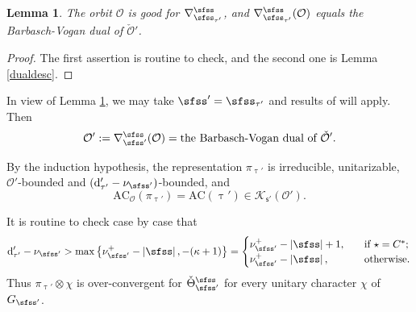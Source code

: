 \documentclass[11pt,a4paper]{amsart}
\def\abs#1{\left|{#1}\right|}
\newcommand{\CK}{{\mathcal {K}}}
\newcommand{\CO}{{\mathcal {O}}}
\numberwithin{equation}{section}
\newtheorem{lem}[thm]{Lemma}
\theoremstyle{remark}
\begin{document}
 \begin{lem}\label{lem78}
 The orbit $\CO$ is good for $\nabla^\sfss_{\sfss_{\tau'}}$, and $\nabla^\sfss_{\sfss_{\tau'}}(\CO)$ equals the Barbasch-Vogan dual  of $\check \CO'$.
 \end{lem}
\begin{proof}
The first assertion is routine to check, and the second one is Lemma \ref{dualdesc}.
\end{proof}

In view of Lemma \ref{lem78}, we may take $\sfss'=\sfss_{\tau'}$ and results of  will apply. Then
\[
\CO':= \nabla^\sfss_{\sfss'}(\CO)=\textrm{the Barbasch-Vogan dual  of $\check \CO'$}.
\]



By the induction hypothesis, the representation $\pi_{\uptau'}$ is irreducible, unitarizable, $\CO'$-bounded and $( \mathrm d'_{\tau'}-\nu_{\sfss'})$-bounded,     and
\[
\mathrm{AC}_\CO(\pi_{\uptau'})=\mathrm{AC}(\uptau')\in \CK_{\mathsf s'}(\CO').
\]

It is routine to check case by case  that
\[
\mathrm d'_{\tau'}-\nu_{\sfss'}>\max \left \{\nu^+_{\sfss'}-\abs{\sfss}, -(\kappa +1)\right \}=
  \begin{cases}
\nu^+_{\sfss'}-\abs{\sfss} +1,\quad& \textrm{if $\star =C^*$};\\
 \nu^+_{\sfss'}-\abs{\sfss},\quad& \textrm{otherwise}.
   \end{cases}
\]
Thus $\pi_{\uptau'}\otimes \chi$ is over-convergent for $\check \Theta_{\sfss'}^{\sfss}$ for every unitary character $\chi$ of $G_{\sfss'}$.
\end{document}
